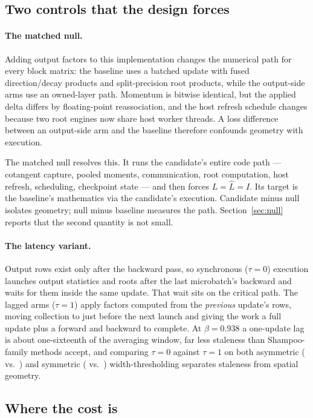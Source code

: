 \subsection{Two controls that the design forces}
\label{sec:method-controls}

\paragraph{The matched null.}
Adding output factors to this implementation changes the numerical path for
every block matrix: the baseline uses a batched update with fused
direction/decay products and split-precision root products, while the
output-side arms use an owned-layer path. Momentum is bitwise identical, but the
applied delta differs by floating-point reassociation, and the host refresh
schedule changes because two root engines now share host worker threads. A loss
difference between an output-side arm and the baseline therefore confounds
geometry with execution.

The matched null resolves this. It runs the candidate's entire code path ---
cotangent capture, pooled moments, communication, root computation, host
refresh, scheduling, checkpoint state --- and then forces $L=\hat L=I$. Its
target is the baseline's mathematics via the candidate's execution. Candidate
minus null isolates geometry; null minus baseline measures the path.
Section~\ref{sec:null} reports that the second quantity is not small.

\paragraph{The latency variant.}
Output rows exist only after the backward pass, so synchronous ($\tau=0$)
execution launches output statistics and roots after the last microbatch's
backward and waits for them inside the same update. That wait sits on the
critical path. The lagged arms ($\tau=1$) apply factors computed from the
\emph{previous} update's rows, moving collection to just before the next launch
and giving the work a full update plus a forward and backward to complete. At
$\beta=0.938$ a one-update lag is about one-sixteenth of the averaging window,
far less staleness than Shampoo-family methods accept, and comparing $\tau=0$
against $\tau=1$ on both asymmetric ( vs.\ ) and
symmetric ( vs.\ ) width-thresholding separates
staleness from spatial geometry.

\subsection{Where the cost is}
\label{sec:method-cost}

